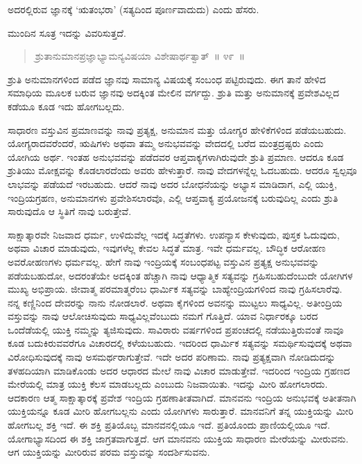 \vspace{-0.3cm}

ಅದರಲ್ಲಿರುವ ಜ್ಞಾನಕ್ಕೆ ‘ಋತಂಭರಾ’ (ಸತ್ಯದಿಂದ ಪೂರ್ಣವಾದುದು) ಎಂದು ಹೆಸರು. 

ಮುಂದಿನ ಸೂತ್ರ ಇದನ್ನು ವಿವರಿಸುತ್ತದೆ. 

\vspace{-0.3cm}

\begin{verse}
ಶ್ರುತಾನುಮಾನಪ್ರಜ್ಞಾಭ್ಯಾಮನ್ಯವಿಷಯಾ ವಿಶೇಷಾರ್ಥತ್ವಾತ್​~॥ ೪೯~॥
\end{verse}

\vspace{-0.3cm}

ಶ್ರುತಿ ಅನುಮಾನಗಳಿಂದ ಪಡೆದ ಜ್ಞಾನವು ಸಾಮಾನ್ಯ ವಿಷಯಕ್ಕೆ ಸಂಬಂಧ ಪಟ್ಟಿರುವುದು. ಈಗ ತಾನೆ ಹೇಳಿದ ಸಮಾಧಿಯ ಮೂಲಕ ಬರುವ ಜ್ಞಾನವು ಅದಕ್ಕಿಂತ ಮೇಲಿನ ವರ್ಗದ್ದು. ಶ್ರುತಿ ಮತ್ತು ಅನುಮಾನಕ್ಕೆ ಪ್ರವೇಶವಿಲ್ಲದ ಕಡೆಯೂ ಕೂಡ ಇದು ಹೋಗಬಲ್ಲದು. 

ಸಾಧಾರಣ ವಸ್ತುವಿನ ಪ್ರಮಾಣವನ್ನು ನಾವು ಪ್ರತ್ಯಕ್ಷ, ಅನುಮಾನ ಮತ್ತು ಯೋಗ್ಯರ ಹೇಳಿಕೆಗಳಿಂದ ಪಡೆಯಬಹುದು. ಯೋಗ್ಯರಾದವರೆಂದರೆ, ಋಷಿಗಳು ಅಥವಾ ತಮ್ಮ ಅನುಭವವನ್ನು ವೇದದಲ್ಲಿ ಬರೆದ ಮಂತ್ರದ್ರಷ್ಟರು ಎಂದು ಯೋಗಿಯ ಅರ್ಥ. ಇಂತಹ ಅನುಭವವನ್ನು ಪಡೆದವರ ಆಪ್ತವಾಕ್ಯಗಳಾಗಿರುವುದೇ ಶ್ರುತಿ ಪ್ರಮಾಣ. ಆದರೂ ಕೂಡ ಶ್ರುತಿಯು ಮೋಕ್ಷವನ್ನು ಕೊಡಲಾರದೆಂದು ಅವರು ಹೇಳುತ್ತಾರೆ. ನಾವು ವೇದಗಳನ್ನೆಲ್ಲ ಓದಬಹುದು. ಆದರೂ ಸ್ವಲ್ಪವೂ ಲಾಭವನ್ನು ಪಡೆಯದೆ ಇರಬಹುದು. ಆದರೆ ನಾವು ಅದರ ಬೋಧನೆಯನ್ನು ಅಭ್ಯಾಸ ಮಾಡಿದಾಗ, ಎಲ್ಲಿ ಯುಕ್ತಿ, ಇಂದ್ರಿಯಗ್ರಹಣ, ಅನುಮಾನಗಳು ಪ್ರವೇಶಿಸಲಾರವೊ, ಎಲ್ಲಿ ಆಪ್ತವಾಕ್ಯ ಪ್ರಯೋಜನಕ್ಕೆ ಬರುವುದಿಲ್ಲ ಎಂದು ಶ್ರುತಿ ಸಾರುವುದೊ ಆ ಸ್ಥಿತಿಗೆ ನಾವು ಬರುತ್ತೇವೆ. 

ಸಾಕ್ಷಾತ್ಕಾರವೇ ನಿಜವಾದ ಧರ್ಮ, ಉಳಿದುವೆಲ್ಲ ಇದಕ್ಕೆ ಸಿದ್ಧತೆಗಳು. ಉಪನ್ಯಾಸ ಕೇಳುವುದು, ಪುಸ್ತಕ ಓದುವುದು, ಅಥವಾ ವಿಚಾರ ಮಾಡುವುದು, ಇವುಗಳೆಲ್ಲ ಕೇವಲ ಸಿದ್ಧತೆ ಮಾತ್ರ. ಇವೇ ಧರ್ಮವಲ್ಲ. ಬೌದ್ಧಿಕ ಆರೋಹಣ ಅವರೋಹಣಗಳು ಧರ್ಮವಲ್ಲ. ಹೇಗೆ ನಾವು ಇಂದ್ರಿಯಕ್ಕೆ ಸಂಬಂಧಪಟ್ಟ ವಸ್ತುವಿನ ಪ್ರತ್ಯಕ್ಷ ಅನುಭವವನ್ನು ಪಡೆಯಬಹುದೋ, ಅದರಂತೆಯೇ ಅದಕ್ಕಿಂತ ಹೆಚ್ಚಾಗಿ ನಾವು ಆಧ್ಯಾತ್ಮಿಕ ಸತ್ಯವನ್ನು ಗ್ರಹಿಸಬಹುದೆಂಬುದೇ ಯೋಗಿಗಳ ಮುಖ್ಯ ಅಭಿಪ್ರಾಯ. ಜೀವಾತ್ಮ ಪರಮಾತ್ಮರೆಂಬ ಧಾರ್ಮಿಕ ಸತ್ಯವನ್ನು ಬಾಹ್ಯೇಂದ್ರಿಯಗಳಿಂದ ನಾವು ಗ್ರಹಿಸಲಾರೆವು. ನನ್ನ ಕಣ್ಣಿನಿಂದ ದೇವರನ್ನು ನಾನು ನೋಡಲಾರೆ. ಅಥವಾ ಕೈಗಳಿಂದ ಅವನನ್ನು ಮುಟ್ಟಲು ಸಾಧ್ಯವಿಲ್ಲ. ಅತೀಂದ್ರಿಯ ವಸ್ತುವನ್ನು ನಾವು ಆಲೋಚಿಸುವುದು ಸಾಧ್ಯವಿಲ್ಲವೆಂಬುದು ನಮಗೆ ಗೊತ್ತಿದೆ. ಯಾವ ನಿರ್ಧಾರಕ್ಕೂ ಬರದ ಒಂದೆಡೆಯಲ್ಲಿ ಯುಕ್ತಿ ನಮ್ಮನ್ನು ತ್ಯಜಿಸುವುದು. ಸಾವಿರಾರು ವರ್ಷಗಳಿಂದ ಪ್ರಪಂಚದಲ್ಲಿ ನಡೆಯುತ್ತಿರುವಂತೆ ನಾವೂ ಕೂಡ ಬದುಕಿರುವವರೆಗೂ ವಿಚಾರದಲ್ಲಿ ಕಳೆಯಬಹುದು. ಇದರಿಂದ ಧಾರ್ಮಿಕ ಸತ್ಯವನ್ನು ಸಮರ್ಥಿಸುವುದಕ್ಕೆ ಅಥವಾ ವಿರೋಧಿಸುವುದಕ್ಕೆ ನಾವು ಅಸಮರ್ಥರಾಗುತ್ತೇವೆ. ಇದೇ ಅದರ ಪರಿಣಾಮ. ನಾವು ಪ್ರತ್ಯಕ್ಷವಾಗಿ ನೋಡಿದುದನ್ನು ತಳಹದಿಯಾಗಿ ಮಾಡಿಕೊಂಡು ಅದರ ಆಧಾರದ ಮೇಲೆ ನಾವು ವಿಚಾರ ಮಾಡುತ್ತೇವೆ. ಇದರಿಂದ ಇಂದ್ರಿಯ ಗ್ರಹಣದ ಮೇರೆಯಲ್ಲಿ ಮಾತ್ರ ಯುಕ್ತಿ ಕೆಲಸ ಮಾಡಬಲ್ಲದು ಎಂಬುದು ನಿಜವಾಯಿತು. ಇದನ್ನು ಮೀರಿ ಹೋಗಲಾರದು. ಆದಕಾರಣ ಆತ್ಮ ಸಾಕ್ಷಾತ್ಕಾರಕ್ಕೆ ಪ್ರವೇಶ ಇಂದ್ರಿಯ ಗ್ರಹಣಾತೀತವಾಗಿದೆ. ಮಾನವನು ಇಂದ್ರಿಯ ಅನುಭವಕ್ಕೆ ಅತೀತನಾಗಿ ಯುಕ್ತಿಯನ್ನೂ ಕೂಡ ಮೀರಿ ಹೋಗಬಲ್ಲನು ಎಂದು ಯೋಗಿಗಳು ಸಾರುತ್ತಾರೆ. ಮಾನವನಿಗೆ ತನ್ನ ಯುಕ್ತಿಯನ್ನು ಮೀರಿ ಹೋಗಬಲ್ಲ ಶಕ್ತಿ ಇದೆ. ಈ ಶಕ್ತಿ ಪ್ರತಿಯೊಬ್ಬ ಮಾನವನಲ್ಲಿಯೂ ಇದೆ. ಪ್ರತಿಯೊಂದು ಪ್ರಾಣಿಯಲ್ಲಿಯೂ ಇದೆ. ಯೋಗಾಭ್ಯಾಸದಿಂದ ಈ ಶಕ್ತಿ ಜಾಗ್ರತವಾಗುತ್ತದೆ. ಆಗ ಮಾನವನು ಯುಕ್ತಿಯ ಸಾಧಾರಣ ಮೇರೆಯನ್ನು ಮೀರುವನು. ಆಗ ಯುಕ್ತಿಯನ್ನು ಮೀರಿರುವ ಪರಮ ವಸ್ತುವನ್ನು ಸಂದರ್ಶಿಸುವನು. 

